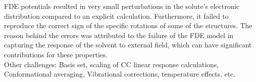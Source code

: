 FDE potentials resulted in very small perturbations in the solute's electronic distribution compared to an explicit 
calculation. Furthermore, it failed to reproduce the correct sign of the specific rotations of some of 
the structures. The reason behind the errors was attributed to the failure of the FDE model in capturing
the response of the solvent to external field, which can have significant contributions for these properties.\\
Other challenges: Basis set, scaling of CC linear response calculations, Conformational averaging, Vibrational corrections,
temperature effects, etc.
